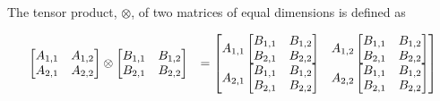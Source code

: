 \documentclass[authoryearcitations]{UoYCSproject}
\begin{document}
The tensor product, $\otimes$, of two matrices of equal dimensions is defined as

\begin{equation}
\begin{array}{r l}
\setlength{\jot}{9pt}
\begin{bmatrix}
        A_{1,1} & A_{1,2} \\
        A_{2,1} & A_{2,2} \\
\end{bmatrix} \otimes
\begin{bmatrix}
        B_{1,1} & B_{1,2} \\
        B_{2,1} & B_{2,2} \\
\end{bmatrix} &= \begin{bmatrix}
                    A_{1,1} \begin{bmatrix}
                             B_{1,1} & B_{1,2} \\
                             B_{2,1} & B_{2,2} \\
                             \end{bmatrix} & A_{1,2} \begin{bmatrix}
                                                      B_{1,1} & B_{1,2} \\
                                                      B_{2,1} & B_{2,2} \\
                                                     \end{bmatrix} \\
 
                    A_{2,1} \begin{bmatrix}
                             B_{1,1} & B_{1,2} \\
                             B_{2,1} & B_{2,2} \\
                             \end{bmatrix} & A_{2,2} \begin{bmatrix}
                                                      B_{1,1} & B_{1,2} \\
                                                      B_{2,1} & B_{2,2} \\
                                                     \end{bmatrix} \\


\end{bmatrix}
\end{array}
\end{equation}
\end{document}
